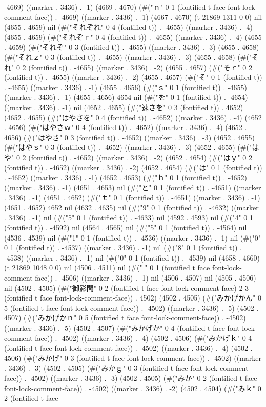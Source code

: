 -4669) ((marker . 3436) . -1) (4669 . 4670) (#("ｎ" 0 1 (fontified t face font-lock-comment-face)) . -4669) ((marker . 3436) . -1) (4667 . 4670) (t 21869 1311 0 0) nil (4655 . 4659) nil (#("それぞれ" 0 4 (fontified t)) . -4655) ((marker . 3436) . -4) (4655 . 4659) (#("それぞｒ" 0 4 (fontified t)) . -4655) ((marker . 3436) . -4) (4655 . 4659) (#("それぞ" 0 3 (fontified t)) . -4655) ((marker . 3436) . -3) (4655 . 4658) (#("それｚ" 0 3 (fontified t)) . -4655) ((marker . 3436) . -3) (4655 . 4658) (#("それ" 0 2 (fontified t)) . -4655) ((marker . 3436) . -2) (4655 . 4657) (#("そｒ" 0 2 (fontified t)) . -4655) ((marker . 3436) . -2) (4655 . 4657) (#("そ" 0 1 (fontified t)) . -4655) ((marker . 3436) . -1) (4655 . 4656) (#("ｓ" 0 1 (fontified t)) . -4655) ((marker . 3436) . -1) (4655 . 4656) 4654 nil (#("を" 0 1 (fontified t)) . -4654) ((marker . 3436) . -1) nil (4652 . 4655) (#("速さを" 0 3 (fontified t)) . 4652) (4652 . 4655) (#("はやさを" 0 4 (fontified t)) . -4652) ((marker . 3436) . -4) (4652 . 4656) (#("はやさｗ" 0 4 (fontified t)) . -4652) ((marker . 3436) . -4) (4652 . 4656) (#("はやさ" 0 3 (fontified t)) . -4652) ((marker . 3436) . -3) (4652 . 4655) (#("はやｓ" 0 3 (fontified t)) . -4652) ((marker . 3436) . -3) (4652 . 4655) (#("はや" 0 2 (fontified t)) . -4652) ((marker . 3436) . -2) (4652 . 4654) (#("はｙ" 0 2 (fontified t)) . -4652) ((marker . 3436) . -2) (4652 . 4654) (#("は" 0 1 (fontified t)) . -4652) ((marker . 3436) . -1) (4652 . 4653) (#("ｈ" 0 1 (fontified t)) . -4652) ((marker . 3436) . -1) (4651 . 4653) nil (#("と" 0 1 (fontified t)) . -4651) ((marker . 3436) . -1) (4651 . 4652) (#("ｔ" 0 1 (fontified t)) . -4651) ((marker . 3436) . -1) (4651 . 4652) 4652 nil (4632 . 4635) nil (#("9" 0 1 (fontified t)) . -4632) ((marker . 3436) . -1) nil (#("5" 0 1 (fontified t)) . -4633) nil (4592 . 4593) nil (#("4" 0 1 (fontified t)) . -4592) nil (4564 . 4565) nil (#("5" 0 1 (fontified t)) . -4564) nil (4536 . 4539) nil (#("1" 0 1 (fontified t)) . -4536) ((marker . 3436) . -1) nil (#("0" 0 1 (fontified t)) . -4537) ((marker . 3436) . -1) nil (#("8" 0 1 (fontified t)) . -4538) ((marker . 3436) . -1) nil (#("0" 0 1 (fontified t)) . -4539) nil (4658 . 4660) (t 21869 1048 0 0) nil (4506 . 4511) nil (#(" " 0 1 (fontified t face font-lock-comment-face)) . -4506) ((marker . 3436) . -1) nil (4506 . 4507) nil (4505 . 4506) nil (4502 . 4505) (#("御影間" 0 2 (fontified t face font-lock-comment-face) 2 3 (fontified t face font-lock-comment-face)) . 4502) (4502 . 4505) (#("みかげかん" 0 5 (fontified t face font-lock-comment-face)) . -4502) ((marker . 3436) . -5) (4502 . 4507) (#("みかげかｎ" 0 5 (fontified t face font-lock-comment-face)) . -4502) ((marker . 3436) . -5) (4502 . 4507) (#("みかげか" 0 4 (fontified t face font-lock-comment-face)) . -4502) ((marker . 3436) . -4) (4502 . 4506) (#("みかげｋ" 0 4 (fontified t face font-lock-comment-face)) . -4502) ((marker . 3436) . -4) (4502 . 4506) (#("みかげ" 0 3 (fontified t face font-lock-comment-face)) . -4502) ((marker . 3436) . -3) (4502 . 4505) (#("みかｇ" 0 3 (fontified t face font-lock-comment-face)) . -4502) ((marker . 3436) . -3) (4502 . 4505) (#("みか" 0 2 (fontified t face font-lock-comment-face)) . -4502) ((marker . 3436) . -2) (4502 . 4504) (#("みｋ" 0 2 (fontified t face 